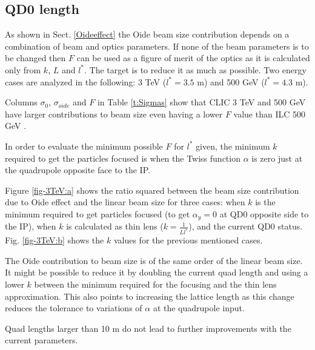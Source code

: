 \subsection{QD0 length}
As shown in Sect. \ref{Oideeffect} the Oide beam size contribution depends on a combination of beam and optics parameters. %
If none of the beam parameters is to be changed then $F$ can be used as a figure of merit of the optics as it is calculated only from $k$, $L$ and $l^*$. The target is to reduce it as much as possible. Two energy cases are analyzed in the following: 3 TeV ($l^*=3.5$ m) and 500 GeV ($l^*=4.3$ m).\par
Columns $\sigma_0$, $\sigma_{oide}$ and $F$ in Table \ref{t:Sigmas} show that CLIC 3 TeV and 500 GeV \cite{CLICdes,TomasCLIC} have larger contributions to beam size even having a lower $F$ value than ILC 500 GeV \cite{ILCdes}.\par
In order to evaluate the minimum possible $F$ for $l^*$ given, the minimum $k$ required to get the particles focused is when the Twiss function $\alpha$ is zero just at the quadrupole opposite face to the IP.\par
Figure \ref{fig-3TeV:a}  shows the ratio squared between the beam size contribution due to Oide effect and the linear beam size for three cases: when $k$ is the minimum required to get particles focused (to get $\alpha_y=0$ at QD0 opposite side to the IP), when $k$ is calculated as thin lens ($k=\frac{1}{Ll^*}$), and the current QD0 status. Fig. \ref{fig-3TeV:b} shows the $k$ values for the previous mentioned cases.\par
The Oide contribution to beam size is of the same order of the linear beam size. It might be possible to reduce it by doubling the current quad length and using a lower $k$ between the minimum required for the focusing and the thin lens approximation. This also points to increasing the lattice length as this change reduces the tolerance to variations of $\alpha$ at the quadrupole input.\par
Quad lengths larger than 10 m do not lead to further improvements with the current parameters.\par

